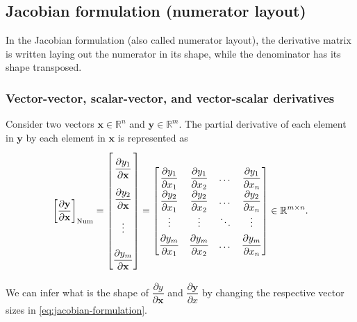 \documentclass{article}
\begin{document}
\subsection{Jacobian formulation (numerator layout)}

In the Jacobian formulation (also called numerator layout), the derivative matrix is written laying out the numerator in its shape, while the denominator has its shape transposed.

\subsubsection{Vector-vector, scalar-vector, and vector-scalar derivatives}
Consider two vectors \(\mathbf{x} \in \mathbb{R}^n\) and \(\mathbf{y} \in \mathbb{R}^m\). The partial derivative of each element in \(\mathbf{y}\) by each element in \(\mathbf{x}\) is represented as
\begin{align}
    \label{eq:jacobian-formulation}
    \left[ \dfrac{\partial \mathbf{y}}{\partial \mathbf{x}} \right]_{\textnormal{Num}} = \renewcommand{\arraystretch}{2.6} \begin{bmatrix}
        \dfrac{\partial y_1}{\partial \mathbf{x}} \\
        \dfrac{\partial y_2}{\partial \mathbf{x}} \\ 
        \vdots \\ 
        \dfrac{\partial y_m}{\partial \mathbf{x}}
    \end{bmatrix} = \renewcommand{\arraystretch}{1.8}
    \begin{bmatrix}
        \dfrac{\partial y_1}{\partial x_1} & \dfrac{\partial y_1}{\partial x_2} & \dots & \dfrac{\partial y_1}{\partial x_n} \\
        \dfrac{\partial y_2}{\partial x_1} & \dfrac{\partial y_2}{\partial x_2} & \dots & \dfrac{\partial y_2}{\partial x_n} \\
        \vdots & \vdots & \ddots & \vdots \\
        \dfrac{\partial y_m}{\partial x_1} & \dfrac{\partial y_m}{\partial x_2} & \dots & \dfrac{\partial y_m}{\partial x_n} \\
    \end{bmatrix} \in \mathbb{R}^{m\times n}.
\end{align}

We can infer what is the shape of \(\dfrac{\partial y}{\partial \mathbf{x}}\) and \(\dfrac{\partial \mathbf{y}}{\partial x}\) by changing the respective vector sizes in \eqref{eq:jacobian-formulation}.
\end{document}

